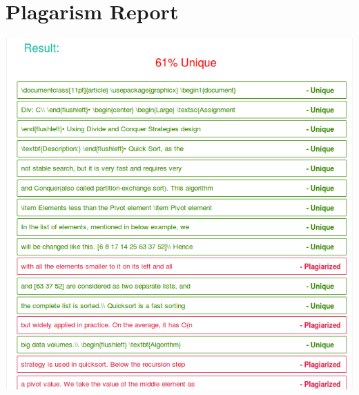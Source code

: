 \documentclass[a4paper,12pt]{article}
\begin{document}
\section{Plagarism Report}
	\includegraphics[width=\textwidth]{obst_plag}
\end{document}
